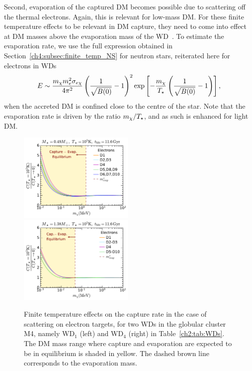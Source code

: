 Second, evaporation of the captured DM becomes possible due to scattering off the thermal electrons.  Again, this is relevant for low-mass DM. 
For these finite temperature effects to be relevant in DM capture, they need to come into effect at DM masses above the evaporation mass of the WD~\cite{Garani:2018kkd_may_NewAnalysisNeutron, Bell:2020lmm_mar_ImprovedTreatmentDark}. 
To estimate the evaporation rate, we use  the full expression  obtained in Section~\ref{ch4:subsec:finite_temp_NS} for neutron stars, reiterated here for electrons in WDs
\begin{equation}
E \sim  \frac{ m_\chi m_e^2\sigma_{e\chi}}{4\pi^2} \left(\frac{1}{\sqrt{B(0)}}-1\right)^2  \exp\left[{-\frac{m_\chi}{T_\star}}\left(\frac{1}{\sqrt{B(0)}}-1\right)\right],  
\label{ch4:eq:evap_WD}
\end{equation}
when the accreted DM is confined close to the centre of the star. 
Note that the evaporation rate is driven by the ratio $m_\chi/T_\star$, and as such is enhanced for light DM. 

\begin{figure}[t!bp]
    \centering
  \includegraphics[width=0.495\textwidth]{wd_capture/R_CT_mdm_10_5K_D1_D10_e_M4S_0.49Msun.pdf}
  \includegraphics[width=0.495\textwidth]{wd_capture/R_CT_mdm_10_5K_D1_D10_e_M4S_1.38Msun.pdf} 
    \caption{Finite temperature effects on the capture rate in the case of scattering on electron targets, for two WDs in the globular cluster M4, namely WD$_1$ (left) and WD$_4$ (right) in Table~\ref{ch2:tab:WDs}. The DM mass range where capture and evaporation are expected to be in equilibrium is shaded in yellow. The dashed brown line corresponds to the evaporation mass.}
    \label{ch4:fig:capTfinelec}
\end{figure}



